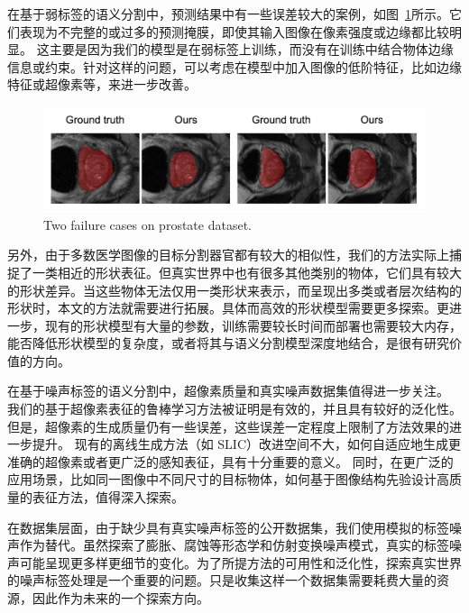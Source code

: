 在基于弱标签的语义分割中，预测结果中有一些误差较大的案例，如图~\ref{fig:failure}所示。它们表现为不完整的或过多的预测掩膜，即使其输入图像在像素强度或边缘都比较明显。
这主要是因为我们的模型是在弱标签上训练，而没有在训练中结合物体边缘信息或约束。针对这样的问题，可以考虑在模型中加入图像的低阶特征，比如边缘特征或超像素等，来进一步改善。
    \begin{figure}[tbp]
        \centering 
        \includegraphics[width=1.0\textwidth]{img/c3/failure.png}
        {Two failure cases on prostate dataset.}
        \label{fig:failure}
    \end{figure}

另外，由于多数医学图像的目标分割器官都有较大的相似性，我们的方法实际上捕捉了一类相近的形状表征。但真实世界中也有很多其他类别的物体，它们具有较大的形状差异。当这些物体无法仅用一类形状来表示，而呈现出多类或者层次结构的形状时，本文的方法就需要进行拓展。具体而高效的形状模型需要更多探索。更进一步，现有的形状模型有大量的参数，训练需要较长时间而部署也需要较大内存，能否降低形状模型的复杂度，或者将其与语义分割模型深度地结合，是很有研究价值的方向。

在基于噪声标签的语义分割中，超像素质量和真实噪声数据集值得进一步关注。
我们的基于超像素表征的鲁棒学习方法被证明是有效的，并且具有较好的泛化性。但是，超像素的生成质量仍有一些误差，这些误差一定程度上限制了方法效果的进一步提升。
现有的离线生成方法（如 SLIC）改进空间不大，如何自适应地生成更准确的超像素或者更广泛的感知表征，具有十分重要的意义。
同时，在更广泛的应用场景，比如同一图像中不同尺寸的目标物体，如何基于图像结构先验设计高质量的表征方法，值得深入探索。

在数据集层面，由于缺少具有真实噪声标签的公开数据集，我们使用模拟的标签噪声作为替代。虽然探索了膨胀、腐蚀等形态学和仿射变换噪声模式，真实的标签噪声可能呈现更多样更细节的变化。为了所提方法的可用性和泛化性，探索真实世界的噪声标签处理是一个重要的问题。只是收集这样一个数据集需要耗费大量的资源，因此作为未来的一个探索方向。
